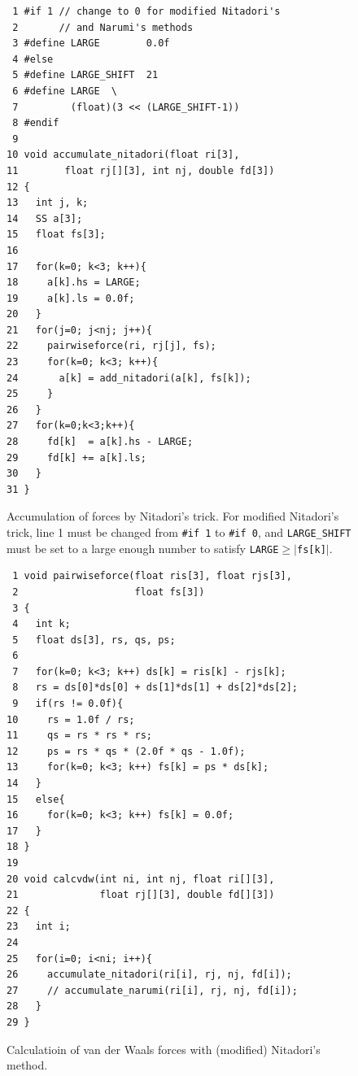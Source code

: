\begin{figure}
\begin{center}\footnotesize
\begin{minipage}{100mm}\def\baselinestretch{0.8}
\begin{verbatim}
 1 #if 1 // change to 0 for modified Nitadori's 
 2       // and Narumi's methods
 3 #define LARGE        0.0f
 4 #else
 5 #define LARGE_SHIFT  21
 6 #define LARGE  \
 7         (float)(3 << (LARGE_SHIFT-1))
 8 #endif
 9 
10 void accumulate_nitadori(float ri[3], 
11        float rj[][3], int nj, double fd[3])
12 {
13   int j, k;
14   SS a[3];
15   float fs[3];
16 
17   for(k=0; k<3; k++){
18     a[k].hs = LARGE;
19     a[k].ls = 0.0f;
20   }
21   for(j=0; j<nj; j++){
22     pairwiseforce(ri, rj[j], fs);
23     for(k=0; k<3; k++){
24       a[k] = add_nitadori(a[k], fs[k]);
25     }
26   }
27   for(k=0;k<3;k++){
28     fd[k]  = a[k].hs - LARGE;
29     fd[k] += a[k].ls;
30   }
31 }
\end{verbatim}\def\baselinestretch{1.0}
\end{minipage}
\caption{Accumulation of forces by Nitadori's trick.
For modified Nitadori's trick, line 1 must be 
changed from {\tt \#if 1} to {\tt \#if 0},
and {\tt LARGE\_SHIFT} must be set to a large enough 
number to satisfy {\tt LARGE}$\geq |${\tt fs[k]}$|$.}
\label{fig:Nitadori2}
\end{center}
\end{figure}

\begin{figure}
\begin{center}\footnotesize
\begin{minipage}{100mm}\def\baselinestretch{0.8}
\begin{verbatim}
 1 void pairwiseforce(float ris[3], float rjs[3], 
 2                    float fs[3])
 3 {
 4   int k;
 5   float ds[3], rs, qs, ps;
 6 
 7   for(k=0; k<3; k++) ds[k] = ris[k] - rjs[k];
 8   rs = ds[0]*ds[0] + ds[1]*ds[1] + ds[2]*ds[2];
 9   if(rs != 0.0f){
10     rs = 1.0f / rs;
11     qs = rs * rs * rs;
12     ps = rs * qs * (2.0f * qs - 1.0f);
13     for(k=0; k<3; k++) fs[k] = ps * ds[k];
14   }
15   else{
16     for(k=0; k<3; k++) fs[k] = 0.0f;
17   }
18 }
19 
20 void calcvdw(int ni, int nj, float ri[][3], 
21              float rj[][3], double fd[][3])
22 {
23   int i;
24 
25   for(i=0; i<ni; i++){
26     accumulate_nitadori(ri[i], rj, nj, fd[i]);
27     // accumulate_narumi(ri[i], rj, nj, fd[i]);
28   }
29 }
\end{verbatim}\def\baselinestretch{1.0}
\end{minipage}
\caption{Calculatioin of van der Waals forces with
(modified) Nitadori's method.}
\label{fig:calcvdw}
\end{center}
\end{figure}


